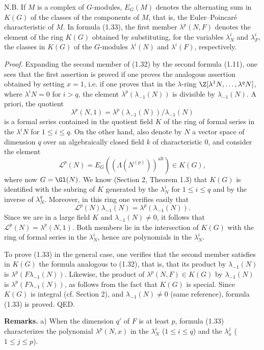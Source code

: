 N.B. If $M$ is a complex of $G$-modules, $E_G(M)$ denotes the alternating sum in $K(G)$ of the classes of the components of $M$, that is, the Euler--Poincaré characteristic of $M$. In formula (1.33), the first member $\lambda^p(N,F)$ denotes the element of the ring $K(G)$ obtained by substituting, for the variables $\lambda^i_N$ and $\lambda^i_F$, the classes in $K(G)$ of the $G$-modules $\lambda^i(N)$ and $\lambda^i(F)$, respectively.

\emph{Proof.} Expanding the second member of (1.32) by the second formula (1.11), one sees that the first assertion is proved if one proves the analogous assertion obtained by setting $x=1$, i.e. if one proves that in the $\lambda$-ring $\Z[\lambda^1N,\ldots,\lambda^qN]$, where $\lambda^iN=0$ for $i>q$, the element $\lambda^p(\lambda_{-1}(N))$ is divisible by $\lambda_{-1}(N)$. A priori, the quotient
\[
\lambda^p(N,1)=\lambda^p(\lambda_{-1}(N))/\lambda_{-1}(N)
\]
is a formal series contained in the quotient field $K$ of the ring of formal series in the $\lambda^iN$ for $1\leq i\leq q$. On the other hand, also denote by $N$ a vector space of dimension $q$ over an algebraically closed field $k$ of characteristic $0$, and consider the element
\[
\mathscr L^p(N)=E_G((\Lambda(N^{(p)}))^{\mathrm{alt}})\in K(G),
\]
where now $G=\Gl(N)$. We know (Section 2, Theorem 1.3) that $K(G)$ is identified with the subring of $K$ generated by the $\lambda^i_N$ for $1\leq i\leq q$ and by the inverse of $\lambda_N^q$. Moreover, in this ring one verifies easily that
\[
\mathscr L^p(N)\lambda_{-1}(N)=\lambda^p(\lambda_{-1}(N)).
\]
Since we are in a large field $K$ and $\lambda_{-1}(N)\neq 0$, it follows that $\mathscr L^p(N)=\lambda^p(N,1)$. Both members lie in the intersection of $K(G)$ with the ring of formal series in the $\lambda_N^i$, hence are polynomials in the $\lambda_N^i$.

To prove (1.33) in the general case, one verifies that the second member satisfies in $K(G)$ the formula analogous to (1.32), that is, that its product by $\lambda_{-1}(N)$ is $\lambda^p(F\lambda_{-1}(N))$. Likewise, the product of $\lambda^p(N,F)\in K(G)$ by $\lambda_{-1}(N)$ is $\lambda^p(F\lambda_{-1}(N))$, as follows from the fact that $K(G)$ is special. Since $K(G)$ is integral (cf. Section 2), and $\lambda_{-1}(N)\neq 0$ (same reference), formula (1.33) is proved. QED.

\textbf{Remarks.} a) When the dimension $q'$ of $F$ is at least $p$, formula (1.33) characterizes the polynomial $\lambda^p(N,x)$ in the $\lambda_N^i$ ($1\leq i\leq q$) and the $\lambda_x^j$ ($1\leq j\leq p$).

